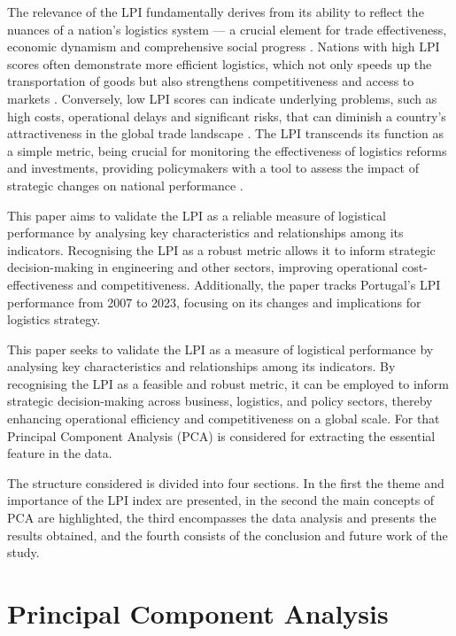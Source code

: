 \documentclass[conference]{IEEEtran}
\begin{document}
The relevance of the LPI fundamentally derives from its ability to reflect the nuances of a nation's logistics system — a crucial element for trade effectiveness, economic dynamism and comprehensive social progress \cite{rezaei2018, sharif2024}. Nations with high LPI scores often demonstrate more efficient logistics, which not only speeds up the transportation of goods but also strengthens competitiveness and access to markets \cite{worldbank4}. Conversely, low LPI scores can indicate underlying problems, such as high costs, operational delays and significant risks, that can diminish a country's attractiveness in the global trade landscape \cite{arvis2016,arvis2018,arvis2023}. The LPI transcends its function as a simple metric, being crucial for monitoring the effectiveness of logistics reforms and investments, providing policymakers with a tool to assess the impact of strategic changes on national performance \cite{worldbank5}. 

This paper aims to validate the LPI as a reliable measure of logistical performance by analysing key characteristics and relationships among its indicators. Recognising the LPI as a robust metric allows it to inform strategic decision-making in engineering and other sectors, improving operational cost-effectiveness and competitiveness. Additionally, the paper tracks Portugal’s LPI performance from 2007 to 2023, focusing on its changes and implications for logistics strategy.

This paper seeks to validate the LPI as a measure of logistical performance by analysing key characteristics and relationships among its indicators. By recognising the LPI as a feasible and robust metric, it can be employed to inform strategic decision-making across business, logistics, and policy sectors, thereby enhancing operational efficiency and competitiveness on a global scale.
For that Principal Component Analysis (PCA) is considered for extracting the essential feature in the data.

The structure considered is divided into four sections. In the first the theme and importance of the LPI index are presented, in the second the main concepts of PCA are highlighted, the third encompasses the data analysis and presents the results obtained, and the fourth consists of the conclusion and future work of the study.


\section{Principal Component Analysis}
\end{document}
